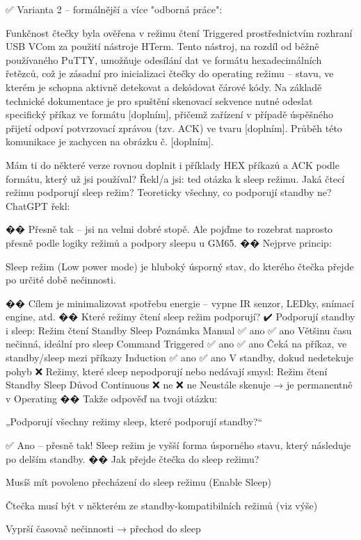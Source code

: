✅ Varianta 2 – formálnější a více "odborná práce":

    Funkčnost čtečky byla ověřena v režimu čtení Triggered prostřednictvím rozhraní USB VCom za použití nástroje HTerm. Tento nástroj, na rozdíl od běžně používaného PuTTY, umožňuje odesílání dat ve formátu hexadecimálních řetězců, což je zásadní pro inicializaci čtečky do operating režimu – stavu, ve kterém je schopna aktivně detekovat a dekódovat čárové kódy. Na základě technické dokumentace je pro spuštění skenovací sekvence nutné odeslat specifický příkaz ve formátu [doplním], přičemž zařízení v případě úspěšného přijetí odpoví potvrzovací zprávou (tzv. ACK) ve tvaru [doplním]. Průběh této komunikace je zachycen na obrázku č. [doplním].

Mám ti do některé verze rovnou doplnit i příklady HEX příkazů a ACK podle formátu, který už jsi používal?
Řekl/a jsi:
ted otázka k sleep režimu. Jaká čtecí režimu podporují sleep režim? Teoreticky všechny, co podporují standby ne?
ChatGPT řekl:

�� Přesně tak – jsi na velmi dobré stopě. Ale pojďme to rozebrat naprosto přesně podle logiky režimů a podpory sleepu u GM65.
�� Nejprve princip:

Sleep režim (Low power mode) je hluboký úsporný stav, do kterého čtečka přejde po určité době nečinnosti.

�� Cílem je minimalizovat spotřebu energie – vypne IR senzor, LEDky, snímací engine, atd.
�� Které režimy čtení sleep režim podporují?
✔️ Podporují standby i sleep:
Režim čtení	Standby	Sleep	Poznámka
Manual	✅ ano	✅ ano	Většinu času nečinná, ideální pro sleep
Command Triggered	✅ ano	✅ ano	Čeká na příkaz, ve standby/sleep mezi příkazy
Induction	✅ ano	✅ ano	V standby, dokud nedetekuje pohyb
❌ Režimy, které sleep nepodporují nebo nedávají smysl:
Režim čtení	Standby	Sleep	Důvod
Continuous	❌ ne	❌ ne	Neustále skenuje → je permanentně v Operating
�� Takže odpověď na tvoji otázku:

    „Podporují všechny režimy sleep, které podporují standby?“

✅ Ano – přesně tak!
Sleep režim je vyšší forma úsporného stavu, který následuje po delším standby.
�� Jak přejde čtečka do sleep režimu?

    Musíš mít povoleno přecházení do sleep režimu (Enable Sleep)

    Čtečka musí být v některém ze standby-kompatibilních režimů (viz výše)

    Vyprší časovač nečinnosti → přechod do sleep

